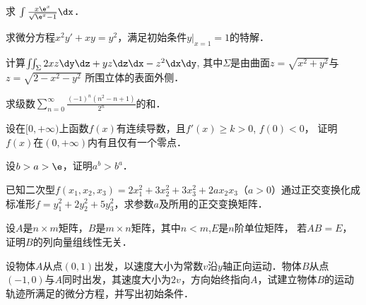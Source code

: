\documentclass[plain,noanswer,medmath]{../../template/jnuexam}
\begin{document}
\begin{problem}
求 $\int \frac{x\e^x}{\sqrt{\e^x - 1}}\dx$．
\end{problem}


\begin{problem}
求微分方程$x^2 y' + xy = y^2$，满足初始条件$y|_{x = 1} = 1$的特解．
\end{problem}



\begin{problem}
计算$\iint_{\Sigma}2xz\dy\dz + yz\dz\dx - z^2 \dx\dy$,
其中$\Sigma$是由曲面$z = \sqrt{x^2 + y^2}$与$z = \sqrt{2 - x^2 - y^2}$ 所围立体的表面外侧．
\end{problem}



\begin{problem}
求级数$\sum_{n = 0}^{\infty}\frac{(- 1)^n(n^2 - n + 1)}{2^n}$的和．
\end{problem}




\begin{problem}
设在$[0,+\infty)$上函数$f(x)$有连续导数，且$f'(x) \ge k > 0$, $f(0) < 0$，
证明$f(x)$在$(0,+\infty)$内有且仅有一个零点．
\end{problem}


\begin{problem}
设$b > a > \e$，证明$a^b > b^a$．
\end{problem}



\begin{problem}
已知二次型$f(x_1,x_2,x_3) = 2x_1^2+ 3x_2^2+ 3x_3^2+ 2ax_2x_3$（$a > 0$）通过正交变换化成标准形$f = y_1^2+ 2y_2^2+ 5y_3^2$，求参数$a$及所用的正交变换矩阵．
\end{problem}



\begin{problem}
设$A$是$n \times m$矩阵，$B$是$m \times n$矩阵，其中$n < m$,$E$是$n$阶单位矩阵，
若$AB = E$，证明$B$的列向量组线性无关．
\end{problem}



\begin{problem}
设物体$A$从点$(0,1)$出发，以速度大小为常数$v$沿$y$轴正向运动．物体$B$从点$(- 1,0)$与$A$同时出发，其速度大小为$2v$，方向始终指向$A$，试建立物体$B$的运动轨迹所满足的微分方程，并写出初始条件．
\end{problem}
\end{document}
